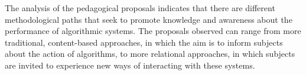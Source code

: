 The analysis of the pedagogical proposals indicates that there are different methodological paths that seek to promote knowledge and awareness about the performance of algorithmic systems. The proposals observed can range from more traditional, content-based approaches, in which the aim is to inform subjects about the action of algorithms, to more relational approaches, in which subjects are invited to experience new ways of interacting with these systems.
